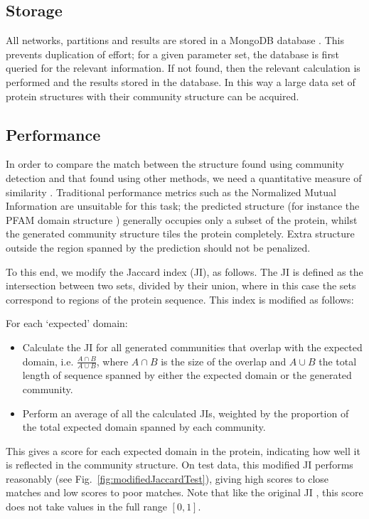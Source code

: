 \documentclass[a4paper,numbib, final, twoside, titelpage]{imaiai}%
\begin{document}
\subsection{Storage}

All networks, partitions and results are stored in a MongoDB database \cite{Chodorow13}. This prevents duplication of effort; for a given parameter set, the database is first queried for the relevant information. If not found, then the relevant calculation is performed and the results stored in the database. In this way a large data set of protein structures with their community structure can be acquired.

\subsection{Performance}

In order to compare the match between the structure found using community detection and that found using other methods, we need a quantitative measure of similarity \cite{Fortunato16}. Traditional performance metrics such as the Normalized Mutual Information are unsuitable for this task; the predicted structure (for instance the PFAM domain structure \cite{Finn16}) generally occupies only a subset of the protein, whilst the generated community structure tiles the protein completely. Extra structure outside the region spanned by the prediction should not be penalized.

To this end, we modify the Jaccard index (JI), as follows. The JI is defined as the intersection between two sets, divided by their union, where in this case the sets correspond to regions of the protein sequence. This index is modified as follows:

For each `expected' domain:
\begin{itemize}
  \item Calculate the JI for all generated communities that overlap with the expected domain, i.e. $\frac{A \cap B}{A \cup B}$, where $A \cap B$ is the size of the overlap and $A \cup B$ the total length of sequence spanned by either the expected domain or the generated community.
  \item Perform an average of all the calculated JIs, weighted by the proportion of the total expected domain spanned by each community.
\end{itemize}

This gives a score for each expected domain in the protein, indicating how well it is reflected in the community structure. On test data, this modified JI performs reasonably (see Fig.~\ref{fig:modifiedJaccardTest}), giving high scores to close matches and low scores to poor matches. Note that like the original JI \cite{Fortunato16}, this score does not take values in the full range $[0,1]$.
\end{document}
